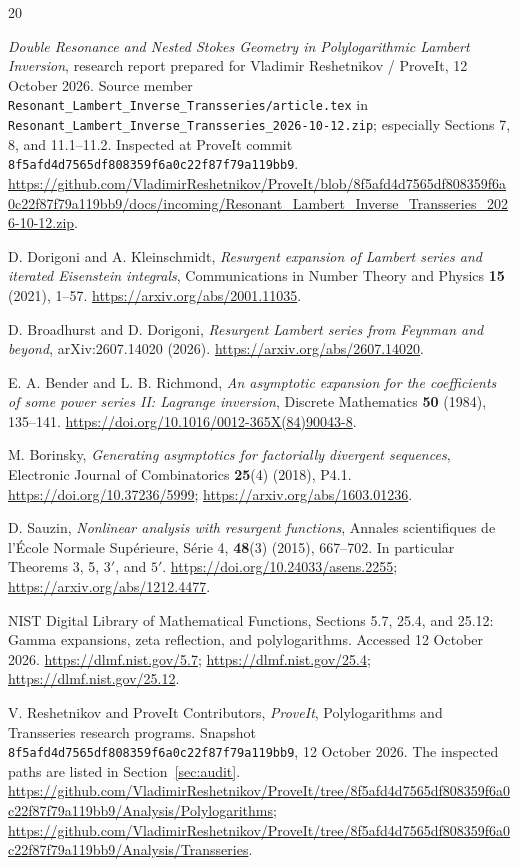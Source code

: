 \begin{thebibliography}{20}
\small
\setlength{\parskip}{0pt}
\setlength{\itemsep}{5pt}
\raggedright
{}
\emph{Double Resonance and Nested Stokes Geometry in Polylogarithmic Lambert
Inversion}, research report prepared for Vladimir Reshetnikov / ProveIt,
12 October 2026. Source member
\nolinkurl{Resonant_Lambert_Inverse_Transseries/article.tex} in
\nolinkurl{Resonant_Lambert_Inverse_Transseries_2026-10-12.zip};
especially Sections 7, 8, and 11.1--11.2. Inspected at ProveIt commit
\texttt{8f5afd4d7565df808359f6a0c22f87f79a119bb9}.
\url{https://github.com/VladimirReshetnikov/ProveIt/blob/8f5afd4d7565df808359f6a0c22f87f79a119bb9/docs/incoming/Resonant_Lambert_Inverse_Transseries_2026-10-12.zip}.

D. Dorigoni and A. Kleinschmidt,
\emph{Resurgent expansion of Lambert series and iterated Eisenstein integrals},
Communications in Number Theory and Physics \textbf{15} (2021), 1--57.
\url{https://arxiv.org/abs/2001.11035}.

D. Broadhurst and D. Dorigoni,
\emph{Resurgent Lambert series from Feynman and beyond},
arXiv:2607.14020 (2026).
\url{https://arxiv.org/abs/2607.14020}.

E. A. Bender and L. B. Richmond,
\emph{An asymptotic expansion for the coefficients of some power series II:
Lagrange inversion}, Discrete Mathematics \textbf{50} (1984), 135--141.
\url{https://doi.org/10.1016/0012-365X(84)90043-8}.

M. Borinsky,
\emph{Generating asymptotics for factorially divergent sequences},
Electronic Journal of Combinatorics \textbf{25}(4) (2018), P4.1.
\url{https://doi.org/10.37236/5999};
\url{https://arxiv.org/abs/1603.01236}.

D. Sauzin,
\emph{Nonlinear analysis with resurgent functions},
Annales scientifiques de l'\'Ecole Normale Sup\'erieure, S\'erie 4,
\textbf{48}(3) (2015), 667--702. In particular Theorems 3, 5, $3'$, and $5'$.
\url{https://doi.org/10.24033/asens.2255};
\url{https://arxiv.org/abs/1212.4477}.

NIST Digital Library of Mathematical Functions,
Sections 5.7, 25.4, and 25.12: Gamma expansions, zeta reflection, and
polylogarithms. Accessed 12 October 2026.
\url{https://dlmf.nist.gov/5.7};
\url{https://dlmf.nist.gov/25.4};
\url{https://dlmf.nist.gov/25.12}.

V. Reshetnikov and ProveIt Contributors,
\emph{ProveIt}, Polylogarithms and Transseries research programs.
Snapshot \texttt{8f5afd4d7565df808359f6a0c22f87f79a119bb9},
12 October 2026. The inspected paths are listed in Section~\ref{sec:audit}.
\url{https://github.com/VladimirReshetnikov/ProveIt/tree/8f5afd4d7565df808359f6a0c22f87f79a119bb9/Analysis/Polylogarithms};
\url{https://github.com/VladimirReshetnikov/ProveIt/tree/8f5afd4d7565df808359f6a0c22f87f79a119bb9/Analysis/Transseries}.
\end{thebibliography}
